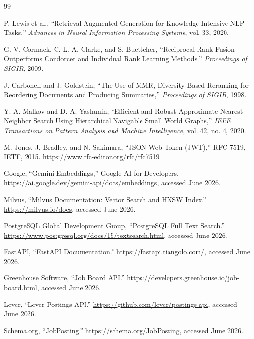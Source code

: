 \documentclass[12pt,a4paper,oneside]{report}
\begin{document}
\begin{thebibliography}{99}

P. Lewis et al., ``Retrieval-Augmented Generation for Knowledge-Intensive NLP Tasks,'' \textit{Advances in Neural Information Processing Systems}, vol. 33, 2020.

G. V. Cormack, C. L. A. Clarke, and S. Buettcher, ``Reciprocal Rank Fusion Outperforms Condorcet and Individual Rank Learning Methods,'' \textit{Proceedings of SIGIR}, 2009.

J. Carbonell and J. Goldstein, ``The Use of MMR, Diversity-Based Reranking for Reordering Documents and Producing Summaries,'' \textit{Proceedings of SIGIR}, 1998.

Y. A. Malkov and D. A. Yashunin, ``Efficient and Robust Approximate Nearest Neighbor Search Using Hierarchical Navigable Small World Graphs,'' \textit{IEEE Transactions on Pattern Analysis and Machine Intelligence}, vol. 42, no. 4, 2020.

M. Jones, J. Bradley, and N. Sakimura, ``JSON Web Token (JWT),'' RFC 7519, IETF, 2015. \url{https://www.rfc-editor.org/rfc/rfc7519}

Google, ``Gemini Embeddings,'' Google AI for Developers. \url{https://ai.google.dev/gemini-api/docs/embeddings}, accessed June 2026.

Milvus, ``Milvus Documentation: Vector Search and HNSW Index.'' \url{https://milvus.io/docs}, accessed June 2026.

PostgreSQL Global Development Group, ``PostgreSQL Full Text Search.'' \url{https://www.postgresql.org/docs/15/textsearch.html}, accessed June 2026.

FastAPI, ``FastAPI Documentation.'' \url{https://fastapi.tiangolo.com/}, accessed June 2026.

Greenhouse Software, ``Job Board API.'' \url{https://developers.greenhouse.io/job-board.html}, accessed June 2026.

Lever, ``Lever Postings API.'' \url{https://github.com/lever/postings-api}, accessed June 2026.

Schema.org, ``JobPosting.'' \url{https://schema.org/JobPosting}, accessed June 2026.
\end{thebibliography}
\end{document}
